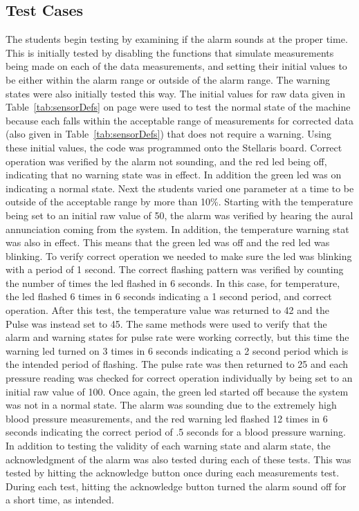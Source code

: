 \documentclass[12pt]{article} %
\begin{document}
    \subsection{Test Cases} The students begin testing by examining if the
    alarm sounds at the proper time.  This is initially tested by disabling the
    functions that simulate measurements being made on each of the data
    measurements, and setting their initial values to be either within the
    alarm range or outside of the alarm range. The warning states were also
    initially tested this way. The initial values for raw data given in
    Table~\ref{tab:sensorDefs} on page \pageref{tab:sensorDefs} were used to
    test the normal state of the machine because each falls within the
    acceptable range of measurements for corrected data (also given in
    Table~\ref{tab:sensorDefs}) that does not require a warning.  Using these
    initial values, the code was programmed onto the Stellaris board.  Correct
    operation was verified by the alarm not sounding, and the red led being
    off, indicating that no warning state was in effect. In addition the green
    led was on indicating a normal state. Next the students varied one
    parameter at a time to be outside of the acceptable range by more than
    10\%. Starting with the temperature being set to an initial raw value of
    50, the alarm was verified by hearing the aural annunciation coming from
    the system. In addition, the temperature warning stat was also in effect.
    This means that the green led was off and the red led was blinking. To
    verify correct operation we needed to make sure the led was blinking with a
    period of 1 second. The correct flashing pattern was verified by counting
    the number of times the led flashed in 6 seconds.  In this case, for
    temperature, the led flashed 6 times in 6 seconds indicating a 1 second
    period, and correct operation. After this test, the temperature value was
    returned to 42 and the Pulse was instead set to 45.  The same methods were
    used to verify that the alarm and warning states for pulse rate were
    working correctly, but this time the warning led turned on 3 times in 6
    seconds indicating a 2 second period which is the intended period of
    flashing. The pulse rate was then returned to 25 and each pressure reading
    was checked for correct operation individually by being set to an initial
    raw value of 100. Once again, the green led started off because the system
    was not in a normal state. The alarm was sounding due to the extremely high
    blood pressure measurements, and the red warning led flashed 12 times in 6
    seconds indicating the correct period of .5 seconds for a blood pressure
    warning. In addition to testing the validity of each warning state and
    alarm state, the acknowledgment of the alarm was also tested during each
    of these tests. This was tested by hitting the acknowledge button once
    during each measurements test. During each test, hitting the acknowledge
    button turned the alarm sound off for a short time, as intended. 
\end{document}
